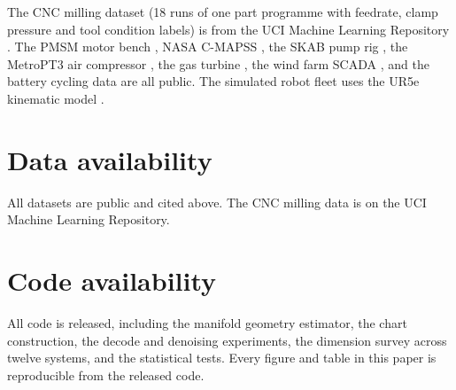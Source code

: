 \documentclass[11pt]{article}
\begin{document}
The CNC milling dataset (18 runs of one part programme with feedrate, clamp
pressure and tool condition labels) is from the UCI Machine Learning Repository
\cite{goecks2019}. The PMSM motor bench \cite{pmsm_data}, NASA C-MAPSS
\cite{saxena2008}, the SKAB pump rig \cite{kutin2018}, the MetroPT3 air
compressor \cite{cardoso2020}, the gas turbine \cite{gtdataset}, the wind
farm SCADA \cite{zahedi2018}, and the battery cycling data
\cite{bafroui2021} are all public. The simulated robot fleet uses the UR5e
kinematic model \cite{ur5e}.

\section*{Data availability}

All datasets are public and cited above. The CNC milling data is on the UCI
Machine Learning Repository.

\section*{Code availability}

All code is released, including the manifold geometry estimator, the chart
construction, the decode and denoising experiments, the dimension survey
across twelve systems, and the statistical tests. Every figure and table in
this paper is reproducible from the released code.
\end{document}
